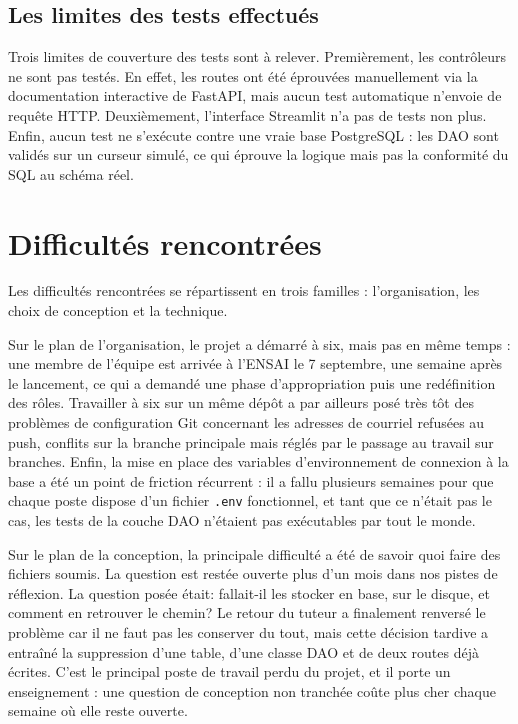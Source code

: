 \documentclass[a4paper,12pt]{article}
\begin{document}
\subsection{Les limites des tests
effectués}\label{les-limites-des-tests-effectuuxe9s}

Trois limites de couverture des tests sont à relever. Premièrement, les
contrôleurs ne sont pas testés. En effet, les routes ont été éprouvées
manuellement via la documentation interactive de FastAPI, mais aucun
test automatique n'envoie de requête HTTP. Deuxièmement, l'interface
Streamlit n'a pas de tests non plus. Enfin, aucun test ne s'exécute
contre une vraie base PostgreSQL : les DAO sont validés sur un curseur
simulé, ce qui éprouve la logique mais pas la conformité du SQL au
schéma réel.

\newpage{}

\section{Difficultés rencontrées}\label{difficultuxe9s-rencontruxe9es}

Les difficultés rencontrées se répartissent en trois familles :
l'organisation, les choix de conception et la technique.

Sur le plan de l'organisation, le projet a démarré à six, mais pas en
même temps : une membre de l'équipe est arrivée à l'ENSAI le 7
septembre, une semaine après le lancement, ce qui a demandé une phase
d'appropriation puis une redéfinition des rôles. Travailler à six sur un
même dépôt a par ailleurs posé très tôt des problèmes de configuration
Git concernant les adresses de courriel refusées au push, conflits sur
la branche principale mais réglés par le passage au travail sur
branches. Enfin, la mise en place des variables d'environnement de
connexion à la base a été un point de friction récurrent : il a fallu
plusieurs semaines pour que chaque poste dispose d'un fichier
\texttt{.env} fonctionnel, et tant que ce n'était pas le cas, les tests
de la couche DAO n'étaient pas exécutables par tout le monde.

Sur le plan de la conception, la principale difficulté a été de savoir
quoi faire des fichiers soumis. La question est restée ouverte plus d'un
mois dans nos pistes de réflexion. La question posée était: fallait-il
les stocker en base, sur le disque, et comment en retrouver le chemin?
Le retour du tuteur a finalement renversé le problème car il ne faut pas
les conserver du tout, mais cette décision tardive a entraîné la
suppression d'une table, d'une classe DAO et de deux routes déjà
écrites. C'est le principal poste de travail perdu du projet, et il
porte un enseignement : une question de conception non tranchée coûte
plus cher chaque semaine où elle reste ouverte.
\end{document}
